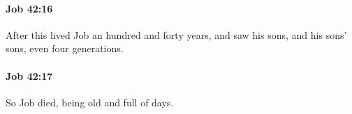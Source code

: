 		\paragraph{Job 42:16} %
			\label{JOB-42-16}

			After this lived Job an hundred and forty years, and saw his sons, and his sons’ sons, even four generations.


		\paragraph{Job 42:17} %
			\label{JOB-42-17}

			So Job died, being old and full of days.

